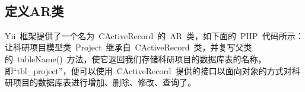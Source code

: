 \noindent
\ttfamily
\hlstd{}\hlstd{}\hlopt{(}\hspace*{\fill}\\
\hlstd{}\hlstd{\ \ \ \ }\hlstd{}\hspace*{\fill}\\
\hlstd{}\hlstd{\ \ \ \ }\hlstd{}\hlstd{}\hlopt{=$>$}\hlstd{}\hlstd{}\hlopt{(}\hspace*{\fill}\\
\hlstd{}\hlstd{\ \ \ \ \ \ \ \ \ \ \ \ }\hlstd{}\hlstd{\ }\hlopt{=$>$\ }\hlstd{}\Righttorque\hspace*{\fill}\\
\hlstr{}\hlstd{\ \ \ \ \ \ \ \ \ \ \ \ }\hlstd{}\hlopt{,}\hspace*{\fill}\\
\hlstd{}\hlstd{\ \ \ \ \ \ \ \ \ \ \ \ }\hlstd{}\hlstd{\ }\hlopt{=$>$\ }\hlopt{,}\hspace*{\fill}\\
\hlstd{}\hlstd{\ \ \ \ \ \ \ \ \ \ \ \ }\hlstd{}\hlstd{\ }\hlopt{=$>$\ }\hlstd{}\hlstd{}\hlopt{,}\hspace*{\fill}\\
\hlstd{}\hlstd{\ \ \ \ \ \ \ \ \ \ \ \ }\hlstd{}\hlstd{\ }\hlopt{=$>$\ }\hlstd{}\hlstd{}\hlopt{,}\hspace*{\fill}\\
\hlstd{}\hlstd{\ \ \ \ \ \ \ \ \ \ \ \ }\hlstd{}\hlstd{\ }\hlopt{=$>$\ }\hlstd{}\hlstd{}\hlopt{,}\hspace*{\fill}\\
\hlstd{}\hlstd{\ \ \ \ \ \ \ \ }\hlstd{}\hlopt{),}\hspace*{\fill}\\
\hlstd{}\hlopt{);}\hlstd{}\hspace*{\fill}\\
\mbox{}
\normalfont
\normalsize

\subsection{定义AR类}

Yii~框架提供了一个名为~CActiveRecord~的~AR~类，如下面的~PHP~代码所示：让科研项目模型类~Project~继承自~CActiveRecord~类，并复写父类的~tableName()~方法，使它返回我们存储科研项目的数据库表的名称，即“tbl\_project”，便可以使用~CActiveRecord~提供的接口以面向对象的方式对科研项目的数据库表进行增加、删除、修改、查询了。

